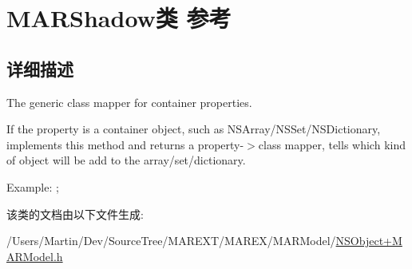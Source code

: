 \hypertarget{class_m_a_r_shadow}{}\section{M\+A\+R\+Shadow类 参考}
\label{class_m_a_r_shadow}


\subsection{详细描述}
The generic class mapper for container properties.

If the property is a container object, such as N\+S\+Array/\+N\+S\+Set/\+N\+S\+Dictionary, implements this method and returns a property-\/$>$class mapper, tells which kind of object will be add to the array/set/dictionary.

Example\+: ; 

该类的文档由以下文件生成\+:\begin{DoxyCompactItemize}
\item 
/\+Users/\+Martin/\+Dev/\+Source\+Tree/\+M\+A\+R\+E\+X\+T/\+M\+A\+R\+E\+X/\+M\+A\+R\+Model/\hyperlink{_n_s_object_09_m_a_r_model_8h}{N\+S\+Object+\+M\+A\+R\+Model.\+h}\end{DoxyCompactItemize}
